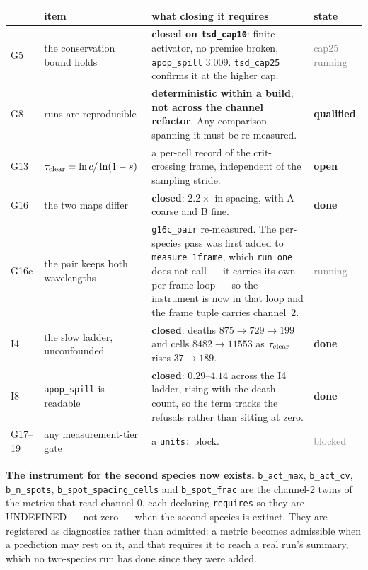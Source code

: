 \documentclass[10pt,a4paper]{article}
\newcommand{\PASS}[1]{\textcolor{passgreen}{\textbf{#1}}}
\newcommand{\FAIL}[1]{\textcolor{failred}{\textbf{#1}}}
\newcommand{\PEND}[1]{\textcolor{gray}{#1}}
\newcommand{\code}[1]{\texttt{#1}}
\newcommand{\op}[1]{\texttt{#1}}
\begin{document}
\begin{center}\small
\begin{tabular}{@{}llp{7.4cm}l@{}}\toprule
& \textbf{item} & \textbf{what closing it requires} & \textbf{state}\\\midrule
G5  & the conservation bound holds &
  \PASS{closed on \op{tsd\_cap10}}: finite activator, no premise broken, \code{apop\_spill}
  $3.009$. \op{tsd\_cap25} confirms it at the higher cap. & \PEND{cap25 running}\\
G8  & runs are reproducible &
  \PASS{deterministic within a build}; \FAIL{not across the channel refactor}. Any comparison
  spanning it must be re-measured. & \FAIL{qualified}\\
G13 & $\tau_{\rm clear}=\ln c/\ln(1-s)$ &
  a per-cell record of the crit-crossing frame, independent of the sampling stride. & \FAIL{open}\\
G16 & the two maps differ &
  \PASS{closed}: $2.2\times$ in spacing, with A coarse and B fine. & \PASS{done}\\
G16c& the pair keeps both wavelengths &
  \op{g16c\_pair} re-measured. The per-species pass was first added to \code{measure\_1frame},
  which \code{run\_one} does not call --- it carries its own per-frame loop --- so the instrument
  is now in that loop and the frame tuple carries channel~2. & \PEND{running}\\
I4  & the slow ladder, unconfounded &
  \PASS{closed}: deaths $875\to729\to199$ and cells $8482\to11553$ as $\tau_{\rm clear}$ rises
  $37\to189$. & \PASS{done}\\
I8  & \code{apop\_spill} is readable &
  \PASS{closed}: $0.29$--$4.14$ across the I4 ladder, rising with the death count, so the term
  tracks the refusals rather than sitting at zero. & \PASS{done}\\
G17--19 & any measurement-tier gate & a \code{units:} block. & \PEND{blocked}\\
\bottomrule
\end{tabular}
\end{center}

\textbf{The instrument for the second species now exists.} \code{b\_act\_max}, \code{b\_act\_cv},
\code{b\_n\_spots}, \code{b\_spot\_spacing\_cells} and \code{b\_spot\_frac} are the channel-2 twins
of the metrics that read channel 0, each declaring \code{requires} so they are UNDEFINED --- not
zero --- when the second species is extinct. They are registered as diagnostics rather than
admitted: a metric becomes admissible when a prediction may rest on it, and that requires it to
reach a real run's summary, which no two-species run has done since they were added.
\end{document}
